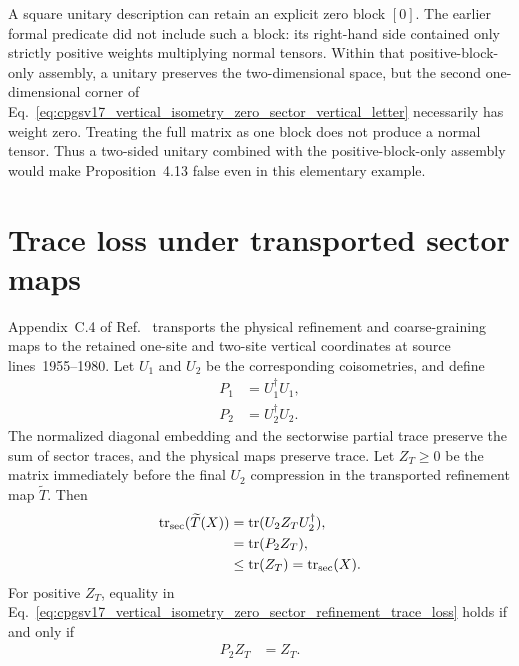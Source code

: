 \documentclass{article}
\begin{document}
A square unitary description can retain an explicit zero block $[0]$. The
earlier formal predicate did not include such a block: its right-hand side
contained only strictly positive weights multiplying normal tensors. Within
that positive-block-only assembly, a unitary preserves the two-dimensional
space, but the second one-dimensional corner of
Eq.~\ref{eq:cpgsv17_vertical_isometry_zero_sector_vertical_letter} necessarily
has weight zero. Treating the full matrix as one block does not produce a
normal tensor. Thus a two-sided unitary combined with the positive-block-only
assembly would make Proposition~4.13 false even in this elementary example.

\section{Trace loss under transported sector maps}

Appendix~C.4 of Ref.~\cite{Cirac2016MPDO_arXiv} transports the physical
refinement and coarse-graining maps to the retained one-site and two-site
vertical coordinates at source lines~1955--1980. Let $U_1$ and $U_2$ be the
corresponding coisometries, and define
\begin{align}
    P_1
        &=U_1^\dagger U_1,
    \label{eq:cpgsv17_vertical_isometry_zero_sector_one_site_projection}\\
    P_2
        &=U_2^\dagger U_2.
    \label{eq:cpgsv17_vertical_isometry_zero_sector_two_site_projection}
\end{align}
The normalized diagonal embedding and the sectorwise partial trace preserve
the sum of sector traces, and the physical maps preserve trace. Let $Z_T\geq0$
be the matrix immediately before the final $U_2$ compression in the
transported refinement map $\widetilde T$. Then
\begin{align}
    \operatorname{tr}_{\mathrm{sec}}(\widetilde T(X))
        &=
        \operatorname{tr}(U_2Z_TU_2^\dagger),
    \label{eq:cpgsv17_vertical_isometry_zero_sector_refinement_trace_compression}\\
        &=
        \operatorname{tr}(P_2Z_T),
    \label{eq:cpgsv17_vertical_isometry_zero_sector_refinement_trace_projection}\\
        &\leq
        \operatorname{tr}(Z_T)
        =
        \operatorname{tr}_{\mathrm{sec}}(X).
    \label{eq:cpgsv17_vertical_isometry_zero_sector_refinement_trace_loss}
\end{align}
For positive $Z_T$, equality in
Eq.~\ref{eq:cpgsv17_vertical_isometry_zero_sector_refinement_trace_loss}
holds if and only if
\begin{align}
    P_2Z_T
        &=Z_T.
    \label{eq:cpgsv17_vertical_isometry_zero_sector_refinement_support}
\end{align}
\end{document}
